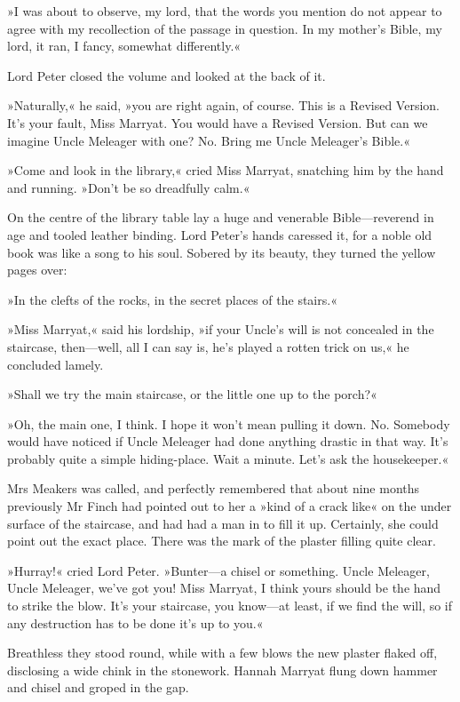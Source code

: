 »I was about to observe, my lord, that the words you mention do not appear to agree with my recollection of the passage in question. In my mother's Bible, my lord, it ran, I fancy, somewhat differently.«

Lord Peter closed the volume and looked at the back of it.

»Naturally,« he said, »you are right again, of course. This is a Revised Version. It's your fault, Miss Marryat. You would have a Revised Version. But can we imagine Uncle Meleager with one? No. Bring me Uncle Meleager's Bible.«

»Come and look in the library,« cried Miss Marryat, snatching him by the hand and running. »Don't be so dreadfully calm.«

On the centre of the library table lay a huge and venerable Bible—reverend in age and tooled leather binding. Lord Peter's hands caressed it, for a noble old book was like a song to his soul. Sobered by its beauty, they turned the yellow pages over:

»In the clefts of the rocks, in the secret places of the stairs.«

»Miss Marryat,« said his lordship, »if your Uncle's will is not concealed in the staircase, then—well, all I can say is, he's played a rotten trick on us,« he concluded lamely.

»Shall we try the main staircase, or the little one up to the porch?«

»Oh, the main one, I think. I hope it won't mean pulling it down. No. Somebody would have noticed if Uncle Meleager had done anything drastic in that way. It's probably quite a simple hiding-place. Wait a minute. Let's ask the housekeeper.«

Mrs Meakers was called, and perfectly remembered that about nine months previously Mr Finch had pointed out to her a »kind of a crack like« on the under surface of the staircase, and had had a man in to fill it up. Certainly, she could point out the exact place. There was the mark of the plaster filling quite clear.

»Hurray!« cried Lord Peter. »Bunter—a chisel or something. Uncle Meleager, Uncle Meleager, we've got you! Miss Marryat, I think yours should be the hand to strike the blow. It's your staircase, you know—at least, if we find the will, so if any destruction has to be done it's up to you.«

Breathless they stood round, while with a few blows the new plaster flaked off, disclosing a wide chink in the stonework. Hannah Marryat flung down hammer and chisel and groped in the gap.


